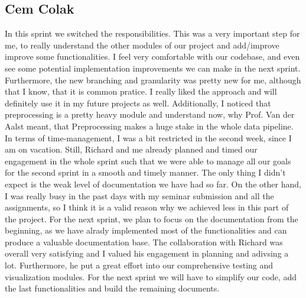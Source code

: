 \documentclass[12pt,a4paper]{article}
\begin{document}
\subsection{Cem Colak}
In this sprint we switched the responsibilities. This was a very important step for me, to really understand the other modules of our project and add/improve improve some functionalities. I feel very comfortable with our codebase, and even see some potential implementation improvements we can make in the next sprint. 
Furthermore, the new branching and granularity was pretty new for me, although that I know, that it is common pratice. I really liked the approach and will definitely use it in my future projects as well. Additionally, I noticed that preprocessing is a pretty heavy module and understand now, why Prof. Van der Aalst meant, that Preprocessing makes a huge stake in the whole data pipeline. 
In terms of time-management, I was a bit restricted in the second week, since I am on vacation. Still, Richard and me already planned and timed our engagement in the whole sprint such that we were able to manage all our goals for the second sprint in a smooth and timely manner. The only thing I didn't expect is the weak level of documentation we have had so far. On the other hand, I was really busy in the past days with my seminar submission and all the assignments, so I think it is a valid reason why we achieved less in this part of the project. For the next sprint, we plan to focus on the documentation from the beginning, as we have alrady implemented most of the functionalities and can produce a valuable documentation base. The collaboration with Richard was overall very satisfying and I valued his engagement in planning and adivsing a lot. Furthermore, he put a great effort into our comprehensive testing and visualization modules. For the next sprint we will have to simplify our code, add the last functionalities and build the remaining documents. 
\end{document}
